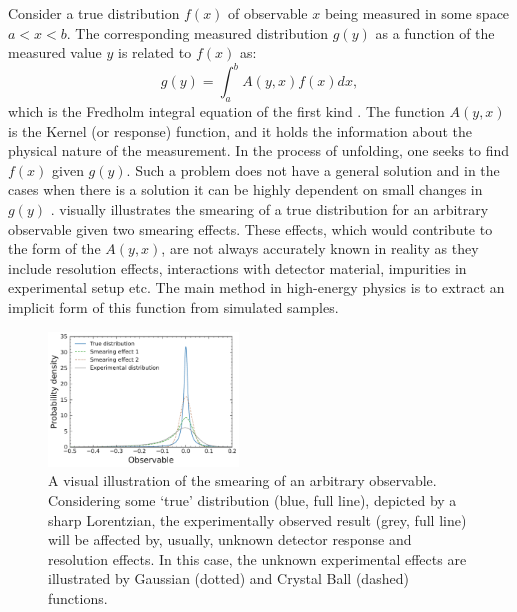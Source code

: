 Consider a true distribution $f(x)$ of observable $x$ being measured in some space $a<x<b$.
The corresponding measured distribution $g(y)$ as a function of the measured value $y$ is related to $f(x)$ as:
\begin{equation}\label{eq:fredholm_integral}
    g(y) =  \int_a^b A(y,x) f(x) dx,
\end{equation}
which is the Fredholm integral equation of the first kind \cite{Blobel_Lohrmann_1998}.
The function $A(y, x)$ is the Kernel (or response) function, and it holds the information about the physical nature of the measurement.
In the process of unfolding, one seeks to find $f(x)$ given $g(y)$.
Such a problem does not have a general solution and in the cases when there is a solution it can be highly dependent on small changes in $g(y)$ \cite{Delves_Walsh_1974}.
 visually illustrates the smearing of a true distribution for an arbitrary observable given two smearing effects.
These effects, which would contribute to the form of the $A(y,x)$, are not always accurately known in reality
as they include resolution effects, interactions with detector material, impurities in experimental setup etc.
The main method in high-energy physics is to extract an implicit form of this function from simulated samples.

\begin{figure}[htpb!]
    \centering
\includegraphics[width=0.45\textwidth]{figures/analysis_techniques/experimental_smearing.pdf}
\caption{\label{fig:smearing_illustration} 
A visual illustration of the smearing of an arbitrary observable.
Considering some `true' distribution (blue, full line), depicted by a sharp Lorentzian, the experimentally observed result (grey, full line) will be affected by, usually, unknown detector response and resolution effects.
In this case, the unknown experimental effects are illustrated by Gaussian (dotted) and Crystal Ball (dashed) functions.}
\end{figure}

